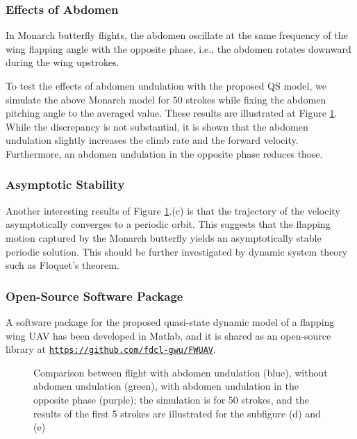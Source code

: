 \documentclass[10pt]{article}
\begin{document}
\subsubsection{Effects of Abdomen}

In Monarch butterfly flights, the abdomen oscillate at the same frequency of the wing flapping angle with the opposite phase,
i.e., the abdomen rotates downward during the wing upstrokes. 


To test the effects of abdomen undulation with the proposed QS model, we simulate the above Monarch model for 50 strokes while fixing the abdomen pitching angle to the averaged value. 
These results are illustrated at Figure \ref{fig:comp_ab}.
While the discrepancy is not substantial, it is shown that the abdomen undulation slightly increases the climb rate and the forward velocity.  
Furthermore, an abdomen undulation in the opposite phase reduces those. 

\subsubsection{Asymptotic Stability}

Another interesting results of Figure \ref{fig:comp_ab}.(c) is that the trajectory of the velocity asymptotically converges to a periodic orbit.  
This suggests that the flapping motion captured by the Monarch butterfly yields an asymptotically stable periodic solution. 
This should be further investigated by dynamic system theory such as Floquet's theorem. 

\subsubsection{Open-Source Software Package}

A software package for the proposed quasi-state dynamic model of a flapping wing UAV has been developed in Matlab, and it is shared as an open-source library at \href{https://github.com/fdcl-gwu/FWUAV}{\texttt{https://github.com/fdcl-gwu/FWUAV}}.

\begin{figure}[p]
    \centerline{
        \hfill
    }
    \centerline{
        \hfill
    }
    \centerline{
    }
    \caption{Comparison between flight with abdomen undulation (blue), without abdomen undulation (green), with abdomen undulation in the opposite phase (purple); the simulation is for 50 strokes, and the results of the first 5 strokes are illustrated for the subfigure (d) and (e)}\label{fig:comp_ab}
\end{figure}
\end{document}
